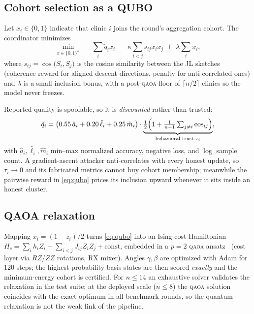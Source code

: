 \documentclass[conference]{IEEEtran}
\newcommand{\qaoa}{\textsc{qaoa}}
\begin{document}
\subsection{Cohort selection as a QUBO}\label{sec:qubo}
Let $x_i\in\{0,1\}$ indicate that clinic $i$ joins the round's aggregation
cohort. The coordinator minimizes
\begin{equation}
\min_{x\in\{0,1\}^n}\;
-\sum_i \tilde q_i x_i \;-\; \kappa\sum_{i<j} s_{ij}x_ix_j
\;+\; \lambda \sum_i x_i ,
\label{eq:qubo}
\end{equation}
where $s_{ij}=\cos\bigl(S_i,S_j\bigr)$ is the cosine similarity between the
JL sketches (coherence reward for aligned descent directions, penalty for
anti-correlated ones) and $\lambda$ is a small inclusion bonus, with a
post-\qaoa{} floor of $\lceil n/2\rceil$ clinics so the model never freezes.

Reported quality is spoofable, so it is \emph{discounted} rather than trusted:
\begin{equation}
\tilde q_i = \bigl(0.55\,\hat a_i + 0.20\,\hat\ell_i + 0.25\,\hat m_i\bigr)
\cdot \underbrace{\tfrac{1}{2}\Bigl(1+\tfrac{1}{n-1}\textstyle\sum_{j\neq i}\cos_{ij}\Bigr)}_{\text{behavioral trust } \tau_i},
\label{eq:trust}
\end{equation}
with $\hat a_i,\hat\ell_i,\hat m_i$ min--max normalized accuracy, negative
loss, and $\log$ sample count. A gradient-ascent attacker anti-correlates with
every honest update, so $\tau_i\!\to\!0$ and its fabricated metrics cannot buy
cohort membership; meanwhile the pairwise reward in
\eqref{eq:qubo} prices its inclusion upward whenever it sits inside an honest
cluster.

\subsection{QAOA relaxation}
Mapping $x_i=(1-z_i)/2$ turns \eqref{eq:qubo} into an Ising cost Hamiltonian
$H_c=\sum_i h_i Z_i+\sum_{i<j}J_{ij}Z_iZ_j+\text{const}$, embedded in a
$p{=}2$ \qaoa{} ansatz~\cite{farhi} (cost layer via $RZ$/$ZZ$ rotations, RX
mixer). Angles $\gamma,\beta$ are optimized with Adam for 120 steps; the
highest-probability basis states are then scored \emph{exactly} and the
minimum-energy cohort is certified. For $n\le 14$ an exhaustive solver
validates the relaxation in the test suite; at the deployed scale
($n\le 8$) the \qaoa{} solution coincides with the exact optimum in all
benchmark rounds, so the quantum relaxation is not the weak link of the
pipeline.
\end{document}
